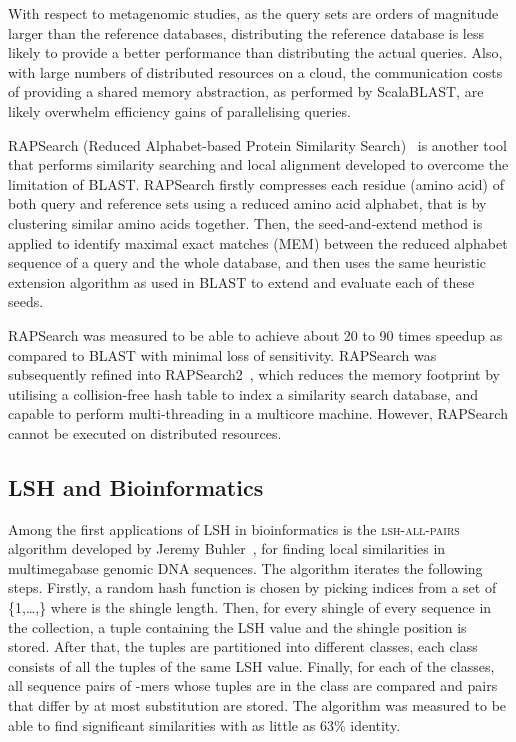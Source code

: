 \documentclass[titlepage]{csetr}
\begin{document}
With respect to metagenomic studies, as the query sets are orders of magnitude larger than the reference databases, distributing the reference database is less likely to provide a better performance than distributing the actual queries. Also, with large numbers of distributed resources on a cloud, the communication costs of providing a shared memory abstraction, as performed by ScalaBLAST, are likely overwhelm efficiency gains of parallelising queries.    




RAPSearch (Reduced Alphabet-based Protein Similarity Search)~\cite{RAPSearch} is another tool that performs similarity searching and local alignment developed to overcome the limitation of BLAST. RAPSearch firstly compresses each residue (amino acid) of both query and reference sets using a reduced amino acid alphabet, that is by clustering similar amino acids together. Then, the seed-and-extend method is applied to identify maximal exact matches (MEM) between the reduced alphabet sequence of a query and the whole database, and then uses the same heuristic extension algorithm as used in BLAST to extend and evaluate each of these seeds. 

RAPSearch was measured to be able to achieve about 20 to 90 times speedup as compared to BLAST with minimal loss of sensitivity. RAPSearch was subsequently refined into RAPSearch2~\cite{RAPSearch2}, which reduces the memory footprint by utilising a collision-free hash table to index a similarity search database, and capable to perform multi-threading in a multicore machine. However, RAPSearch cannot be executed on distributed resources.





\subsection{LSH and Bioinformatics}

Among the first applications of LSH in bioinformatics is the \textsc{lsh-all-pairs} algorithm developed by Jeremy Buhler~\cite{SequenceComparisonLSH}, for finding local similarities in multimegabase genomic DNA sequences. The algorithm iterates the following steps. Firstly, a random hash function is chosen by picking  indices from a set of \{1,\ldots,\} where  is the shingle length. Then, for every shingle of every sequence in the collection, a tuple containing the LSH value and the shingle position is stored. After that, the tuples are partitioned into different classes, each class consists of all the tuples of the same LSH value. Finally, for each of the classes, all sequence pairs of -mers whose tuples are in the class are compared and pairs that differ by at most  substitution are stored. The algorithm was measured to be able to find significant similarities with as little as 63\% identity.
\end{document}
